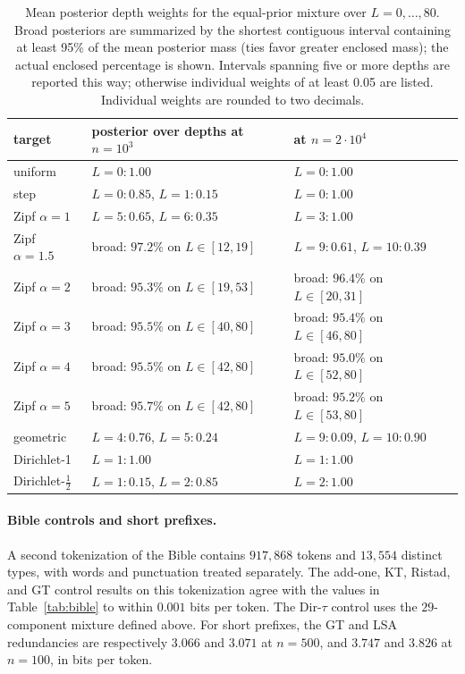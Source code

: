 \documentclass[anon]{alt2027}
\begin{document}
\begin{table}[!htbp]
\centering
\footnotesize
\caption{Mean posterior depth weights for the equal-prior mixture over $L=0,\ldots,80$. Broad posteriors are summarized by the shortest contiguous interval containing at least 95\% of the mean posterior mass (ties favor greater enclosed mass); the actual enclosed percentage is shown. Intervals spanning five or more depths are reported this way; otherwise individual weights of at least 0.05 are listed. Individual weights are rounded to two decimals.}
\label{tab:posteriors}
\setlength{\tabcolsep}{2pt}
\begin{tabular}{lll}
\toprule
target & posterior over depths at $n=10^3$ & at $n=2\cdot10^4$ \\
\midrule
uniform & $L{=}0:1.00$ & $L{=}0:1.00$ \\
step & $L{=}0:0.85$, $L{=}1:0.15$ & $L{=}0:1.00$ \\
Zipf $\alpha=1$ & $L{=}5:0.65$, $L{=}6:0.35$ & $L{=}3:1.00$ \\
Zipf $\alpha=1.5$ & broad: $97.2\%$ on $L\in[12,19]$ & $L{=}9:0.61$, $L{=}10:0.39$ \\
Zipf $\alpha=2$ & broad: $95.3\%$ on $L\in[19,53]$ & broad: $96.4\%$ on $L\in[20,31]$ \\
Zipf $\alpha=3$ & broad: $95.5\%$ on $L\in[40,80]$ & broad: $95.4\%$ on $L\in[46,80]$ \\
Zipf $\alpha=4$ & broad: $95.5\%$ on $L\in[42,80]$ & broad: $95.0\%$ on $L\in[52,80]$ \\
Zipf $\alpha=5$ & broad: $95.7\%$ on $L\in[42,80]$ & broad: $95.2\%$ on $L\in[53,80]$ \\
geometric & $L{=}4:0.76$, $L{=}5:0.24$ & $L{=}9:0.09$, $L{=}10:0.90$ \\
Dirichlet-1 & $L{=}1:1.00$ & $L{=}1:1.00$ \\
Dirichlet-$\frac12$ & $L{=}1:0.15$, $L{=}2:0.85$ & $L{=}2:1.00$ \\
\bottomrule
\end{tabular}
\end{table}

\paragraph{Bible controls and short prefixes.} A second tokenization of the Bible contains $917{,}868$ tokens and $13{,}554$ distinct types, with words and punctuation treated separately. The add-one, KT, Ristad, and GT control results on this tokenization agree with the values in Table~\ref{tab:bible} to within $0.001$ bits per token. The Dir-$\tau$ control uses the $29$-component mixture defined above. For short prefixes, the GT and LSA redundancies are respectively $3.066$ and $3.071$ at $n=500$, and $3.747$ and $3.826$ at $n=100$, in bits per token.
\end{document}
